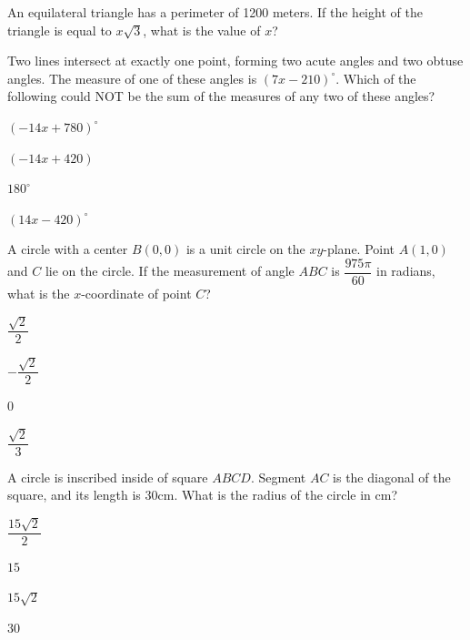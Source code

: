 \vfill
\clearpage
\noindent\begin{minipage}{\linewidth}
\par\smallskip
An equilateral triangle has a perimeter of 1200 meters. If the height of the triangle is equal to $x\sqrt{3}$, what is the value of $x$?
\end{minipage}
\vfill
\noindent\begin{minipage}{\linewidth}
\par\smallskip
Two lines intersect at exactly one point, forming two acute angles and two obtuse angles. The measure of one of these angles is $(7x-210)^\circ$. Which of the following could NOT be the sum of the measures of any two of these angles?
\begin{satchoices}
  \item[A)] $(-14x+780)^\circ$
  \item[B)] $(-14x+420)$
  \item[C)] $180^\circ$
  \item[D)] $(14x-420)^\circ$
\end{satchoices}
\end{minipage}
\vfill
\noindent\begin{minipage}{\linewidth}
\par\smallskip
A circle with a center $B(0,0)$ is a unit circle on the $xy$-plane. Point $A(1,0)$ and $C$ lie on the circle. If the measurement of angle $ABC$ is $\dfrac{975\pi}{60}$ in radians, what is the $x$-coordinate of point $C$?
\begin{satchoices}
  \item[A)] $\dfrac{\sqrt{2}}{2}$
  \item[B)] $-\dfrac{\sqrt{2}}{2}$
  \item[C)] $0$
  \item[D)] $\dfrac{\sqrt{2}}{3}$
\end{satchoices}
\end{minipage}
\vfill
\clearpage
\noindent\begin{minipage}{\linewidth}
\par\smallskip
A circle is inscribed inside of square $ABCD$. Segment $AC$ is the diagonal of the square, and its length is 30cm. What is the radius of the circle in cm?
\begin{satchoices}
  \item[A)] $\dfrac{15\sqrt{2}}{2}$
  \item[B)] $15$
  \item[C)] $15\sqrt{2}$
  \item[D)] $30$
\end{satchoices}
\end{minipage}
